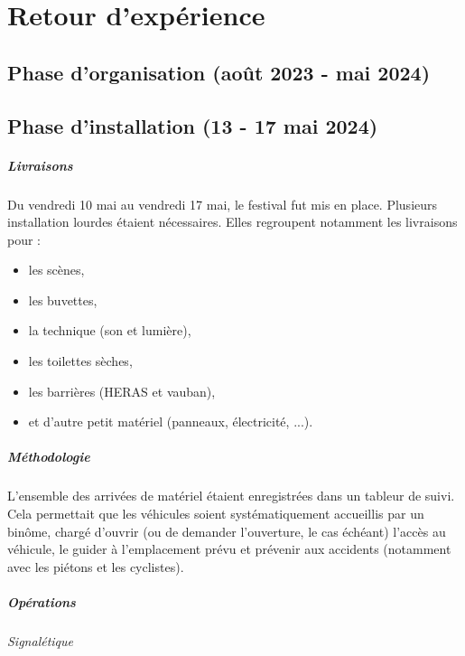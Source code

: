 \documentclass[12pt,a4paper]{report}
\begin{document}
\chapter{Retour d'expérience}

\section{Phase d'organisation (août 2023 - mai 2024)}
\vfill

\section{Phase d'installation (13 - 17 mai 2024)}

\paragraph{Livraisons}

Du vendredi 10 mai au vendredi 17 mai, le festival fut mis en place. Plusieurs installation lourdes étaient nécessaires. Elles regroupent notamment les livraisons pour : 
\begin{itemize}
\item les scènes,
\item les buvettes,
\item la technique (son et lumière),
\item les toilettes sèches, 
\item les barrières (HERAS et vauban),
\item et d'autre petit matériel (panneaux, électricité, ...).
\end{itemize}

\paragraph{Méthodologie}

L'ensemble des arrivées de matériel étaient enregistrées dans un tableur de suivi. Cela permettait que les véhicules soient systématiquement accueillis par un binôme, chargé d'ouvrir (ou de demander l'ouverture, le cas échéant) l'accès au véhicule, le guider à l'emplacement prévu et prévenir aux accidents (notamment avec les piétons et les cyclistes).

\paragraph{Opérations}

\subparagraph{Signalétique}
\end{document}
